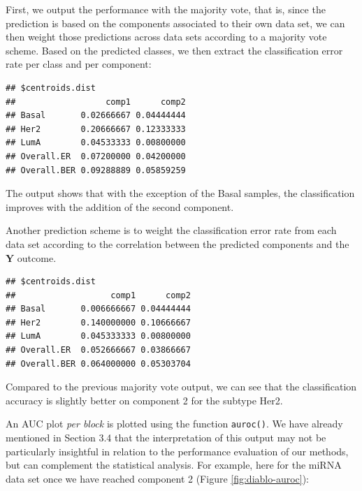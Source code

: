 \documentclass[]{book}
\newenvironment{Shaded}{\begin{snugshade}}{\end{snugshade}}
\newcommand{\CommentTok}[1]{\textcolor[rgb]{0.56,0.35,0.01}{\textit{#1}}}
\newcommand{\OperatorTok}[1]{\textcolor[rgb]{0.81,0.36,0.00}{\textbf{#1}}}
\newcommand{\NormalTok}[1]{#1}
\begin{document}
First, we output the performance with the majority vote, that is, since
the prediction is based on the components associated to their own data
set, we can then weight those predictions across data sets according to
a majority vote scheme. Based on the predicted classes, we then extract
the classification error rate per class and per component:

\begin{Shaded}
\end{Shaded}

\begin{verbatim}
## $centroids.dist
##                  comp1      comp2
## Basal       0.02666667 0.04444444
## Her2        0.20666667 0.12333333
## LumA        0.04533333 0.00800000
## Overall.ER  0.07200000 0.04200000
## Overall.BER 0.09288889 0.05859259
\end{verbatim}

The output shows that with the exception of the Basal samples, the
classification improves with the addition of the second component.

Another prediction scheme is to weight the classification error rate
from each data set according to the correlation between the predicted
components and the \(\boldsymbol Y\) outcome.

\begin{Shaded}
\end{Shaded}

\begin{verbatim}
## $centroids.dist
##                   comp1      comp2
## Basal       0.006666667 0.04444444
## Her2        0.140000000 0.10666667
## LumA        0.045333333 0.00800000
## Overall.ER  0.052666667 0.03866667
## Overall.BER 0.064000000 0.05303704
\end{verbatim}

Compared to the previous majority vote output, we can see that the
classification accuracy is slightly better on component 2 for the
subtype Her2.

An AUC plot \emph{per block} is plotted using the function
\texttt{auroc()}. We have already mentioned in Section 3.4 that the
interpretation of this output may not be particularly insightful in
relation to the performance evaluation of our methods, but can
complement the statistical analysis. For example, here for the miRNA
data set once we have reached component 2 (Figure
\ref{fig:diablo-auroc}):
\end{document}
